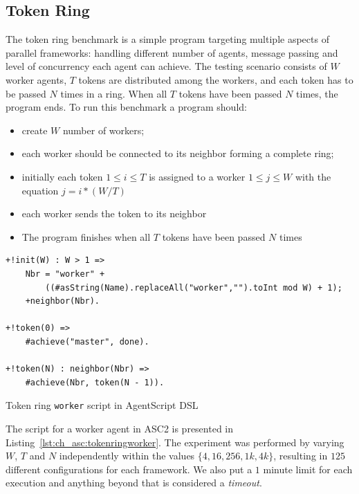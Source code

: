 \subsection{Token Ring}
The token ring benchmark is a simple program targeting multiple aspects of parallel frameworks: handling different number of agents, message passing and level of concurrency each agent can achieve. The testing scenario consists of $W$ worker agents, $T$ tokens are distributed among the workers, and each token has to be passed $N$ times in a ring. When all $T$ tokens have been passed $N$ times, the program ends. To run this benchmark a program should:
\begin{itemize}
    \item create $W$ number of workers;
    \item each worker should be connected to its neighbor forming a complete ring;
    \item initially each token $1\leq i \leq T$  is assigned to a worker $1\leq j \leq W$ with the equation $j = i * (W/T)$
    \item each worker sends the token to its neighbor
    \item The program finishes when all $T$ tokens have been passed $N$ times
\end{itemize}

\begin{listing}[!tb]
\centering
\begin{tcolorbox}[left=2pt,right=2pt,top=2pt,bottom=2pt,arc=0pt,
                  boxrule=0pt,toprule=1pt,
                  colback=white]
\begin{verbatim}
+!init(W) : W > 1 =>
    Nbr = "worker" + 
        ((#asString(Name).replaceAll("worker","").toInt mod W) + 1);
    +neighbor(Nbr).

+!token(0) =>
    #achieve("master", done).

+!token(N) : neighbor(Nbr) =>
    #achieve(Nbr, token(N - 1)).
\end{verbatim}
\end{tcolorbox}
    \caption{Token ring \texttt{worker} script in AgentScript DSL}
    \label{lst:ch_asc:tokenringworker}

\end{listing}

The script for a worker agent in ASC2 is presented in Listing~\ref{lst:ch_asc:tokenringworker}. The experiment was performed by varying $W$, $T$ and $N$ independently within the values $\{4,16,256,1k,4k\}$, resulting in $125$ different configurations for each framework. We also put a $1$ minute limit for each execution and anything beyond that is considered a \textit{timeout}. 

